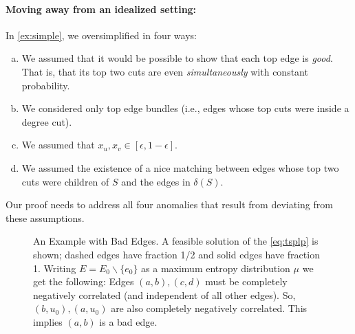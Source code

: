 \paragraph{Moving away from an idealized setting:}
In \cref{ex:simple}, we oversimplified in four ways:
\begin{enumerate}[(a)]
\item We assumed that it would be possible to show that each top edge is {\em good}. That is, that its top two cuts are even {\em simultaneously} with constant probability.

\item We considered only top edge bundles (i.e., edges whose top cuts were inside a degree cut).

\item 	We assumed that $x_u, x_v \in [\epsilon, 1-\epsilon]$.
\item We assumed the existence of a nice matching between edges  whose top two cuts were children of $S$ and the edges in $\delta(S)$.
\end{enumerate}
Our proof needs to address all four anomalies that result from deviating from these assumptions. 

\begin{figure}[htb]\centering
{}
\caption{An Example with Bad Edges. A feasible solution of the \ref{eq:tsplp} is shown; dashed edges have fraction 1/2 and solid edges have fraction 1. Writing $E=E_0\smallsetminus \{e_0\}$ as a maximum entropy distribution $\mu$ we get the following: Edges $(a,b),(c,d)$ must be completely negatively correlated (and independent of all other edges). So, $(b,u_0), (a,u_0)$ are also completely negatively correlated. This implies $(a,b)$ is a bad edge. }
\label{fig:badedgeexistence}
\end{figure}


